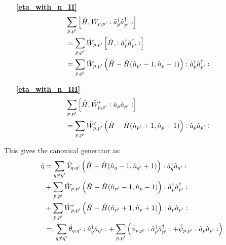\begin{appendix}
\begin{itemize}
\begin{align}
\end{align}
\item[\textbf{\ref{eta_with_n_II}}] 
\begin{align}
&\sum\limits_{p,p^\prime}\left[\hat H,\hat W_{p,p^\prime}\vcentcolon \hat a^\dagger_p\hat a^\dagger_{p^\prime}\vcentcolon\right] \nonumber \\
&=\sum\limits_{p,p^\prime}\hat W_{p,p^\prime}\left[\hat H,\vcentcolon \hat a^\dagger_p\hat a^\dagger_{p^\prime}\vcentcolon\right] \nonumber\\
&= \sum\limits_{p,p^\prime}\hat W_{p,p^\prime}\left(\hat H-\hat H(\hat n_{p^\prime}-1,\hat n_p -1)\right)\vcentcolon \hat a^\dagger_p\hat a^\dagger_{p^\prime}\vcentcolon
\end{align}
\item[\textbf{\ref{eta_with_n_III}}] 
\begin{align}
&\sum\limits_{p,p^\prime}\left[\hat H,\hat W_{p,p^\prime}^\prime\vcentcolon\hat a_p\hat a_{p^\prime} \vcentcolon \right] \nonumber \\
&= \sum\limits_{p,p^\prime}\hat W_{p,p^\prime}^\prime\left(\hat H-\hat H(\hat n_{p^\prime}+1,\hat n_p +1)\right)\vcentcolon \hat a_p\hat a_{p^\prime}\vcentcolon
\end{align}
\end{itemize}
This gives the canonical generator as:
\begin{align}
\hat\eta &=  \sum\limits_{q\neq q^\prime}\hat V_{q,q^\prime} \left(\hat H - \hat H(\hat n_q-1,\hat n_{q^\prime}+1)\right) \vcentcolon \hat a^\dagger_q\hat a_{q^\prime}\vcentcolon \\
&+\sum\limits_{p,p^\prime}\hat W_{p,p^\prime}\left(\hat H-\hat H(\hat n_{p^\prime}-1,\hat n_p -1)\right)\vcentcolon \hat a^\dagger_p\hat a^\dagger_{p^\prime}\vcentcolon\nonumber\\
&+ \sum\limits_{p,p^\prime}\hat W_{p,p^\prime}^\prime\left(\hat H-\hat H(\hat n_{p^\prime}+1,\hat n_p +1)\right)\vcentcolon \hat a_p\hat a_{p^\prime}\vcentcolon\nonumber\\
&=\vcentcolon \sum\limits_{q\neq q^\prime}\hat \theta_{q,q^\prime}\vcentcolon \hat a^\dagger_q\hat a_{q^\prime}\vcentcolon+\sum\limits_{p,p^\prime}\left(\hat \phi_{p,p^\prime}\vcentcolon \hat a^\dagger_p\hat a^\dagger_{p^\prime}\vcentcolon+\hat \psi_{p,p^\prime}\vcentcolon\hat a_p\hat a_{p^\prime}\vcentcolon\right) \label{psiphitheta_def}
\end{align}

\end{appendix}
